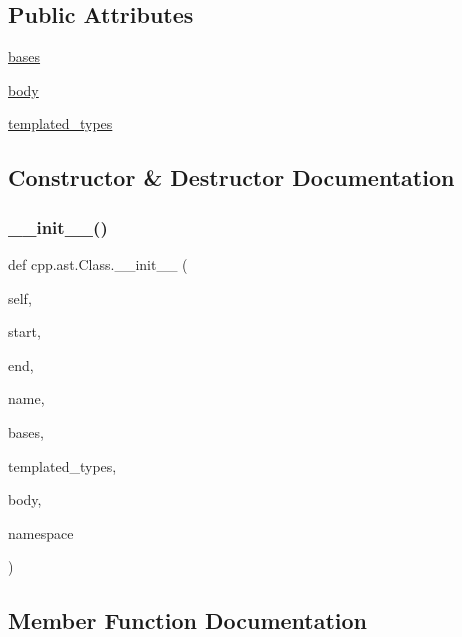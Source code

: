 \subsection*{Public Attributes}
\begin{DoxyCompactItemize}
\item 
\mbox{\hyperlink{classcpp_1_1ast_1_1Class_a5665eb67314a075d4e0ff91accbde5d1}{bases}}
\item 
\mbox{\hyperlink{classcpp_1_1ast_1_1Class_add39f61fdcf6dae42d79cac3dcbb7782}{body}}
\item 
\mbox{\hyperlink{classcpp_1_1ast_1_1Class_a48ed0d3115656554d9134bc1787390fa}{templated\+\_\+types}}
\end{DoxyCompactItemize}


\subsection{Constructor \& Destructor Documentation}
\mbox{\label{classcpp_1_1ast_1_1Class_acc17c34512d5cc54d5125734ce79f219}} 
\subsubsection{\texorpdfstring{\_\_init\_\_()}{\_\_init\_\_()}}
{\footnotesize\ttfamily def cpp.\+ast.\+Class.\+\_\+\+\_\+init\+\_\+\+\_\+ (\begin{DoxyParamCaption}\item[{}]{self,  }\item[{}]{start,  }\item[{}]{end,  }\item[{}]{name,  }\item[{}]{bases,  }\item[{}]{templated\+\_\+types,  }\item[{}]{body,  }\item[{}]{namespace }\end{DoxyParamCaption})}



\subsection{Member Function Documentation}
\mbox{\label{classcpp_1_1ast_1_1Class_a0a63f6fab75d61ffac6fb9f1c29ae84d}} 
